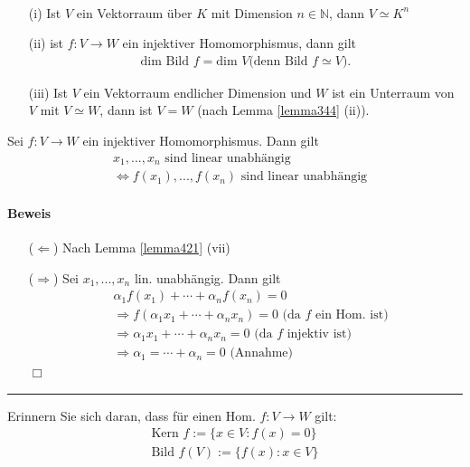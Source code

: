 \documentclass[11pt]{report}
\newcommand*\Zb[1] {\mathbb{#1}}
\begin{document}
\begin{korollar}
\label{korollar423} {\ \\}
 \begin{itemize}
  \item[(i)] Ist $V$ ein Vektorraum über $K$ mit Dimension $n\in \Zb{N}$, dann $V \simeq K^n$
  \item[(ii)] ist $f: V \rightarrow W$ ein injektiver Homomorphismus, dann gilt
\begin{align}
 \text{dim Bild } f = \text{dim }V \text{(denn Bild $f \simeq V$).}
\end{align}
  \item[(iii)] Ist $V$ ein Vektorraum endlicher Dimension und $W$ ist ein Unterraum von $V$ mit $V \simeq W$, dann ist $V=W$ (nach Lemma \ref{lemma344} (ii)).
 \end{itemize}
\end{korollar}

\begin{lemma}
 \label{lemma424}
Sei $f: V \rightarrow W$ ein injektiver Homomorphismus. Dann gilt
\begin{align}
 &x_1, ..., x_n \text{ sind linear unabhängig } \\ &\Leftrightarrow f(x_1), ..., f(x_n) \text{ sind linear unabhängig}
\end{align}
\end{lemma}
\paragraph{Beweis}
\begin{itemize}
 \item[($\Leftarrow$)] Nach Lemma \ref{lemma421} (vii)
 \item[($\Rightarrow$)] Sei $x_1, ..., x_n$ lin. unabhängig. Dann gilt
\begin{align}
 &\alpha_1 f(x_1) + \cdots + \alpha_n f(x_n) = 0 \\
 &\Rightarrow f( \alpha_1 x_1 + \cdots + \alpha_n x_n) = 0 \text{ (da $f$ ein Hom. ist)}\\
 &\Rightarrow \alpha_1 x_1 + \cdots + \alpha_n x_n = 0 \text{ (da $f$ injektiv ist)}\\
 &\Rightarrow \alpha_1 = \cdots + \alpha_n = 0 \text{ (Annahme)}
\end{align}
\hspace*{1cm}  \hfill $\Box$
\end{itemize}
\vspace*{0.2cm}\rule{\linewidth}{0.3mm}\vspace{0.2cm}
Erinnern Sie sich daran, dass für einen Hom. $f: V \rightarrow W$ gilt:
\begin{align}
 \text{Kern } f := \{x \in V: f(x) = 0\}\\
 \text{Bild } f(V) := \{f(x): x \in V\}
\end{align}
\end{document}
